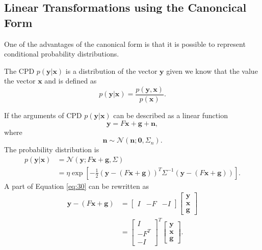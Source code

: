 \documentclass[12pt,oneside,openany,a4paper, %
afrikaans,english,
]{memoir}
\numberwithin{equation}{chapter}
\begin{document}
\subsection{Linear Transformations using the Canoncical Form}
One of the advantages of the canonical form is that it is possible to represent conditional probability distributions.

The CPD $p(\bm{y}|\bm{x})$ is a distribution of the vector $\bm{y}$ given we know that the value the vector $\bm{x}$ and is defined as
\begin{equation}
p(\bm{y}|\bm{x}) = \frac{p(\bm{y},\bm{x})}{p(\bm{x})}.
\end{equation}

If the arguments of CPD $p(\bm{y}|\bm{x})$ can be described as a linear function
\begin{equation}
\bm{y} = F\bm{x} + \bm{g} + \bm{n},
\end{equation}
where
\begin{equation}
\bm{n} \sim \mathcal{N}(\bm{n}; \bm{0}, \Sigma_n).
\end{equation}
The probability distribution is
\begin{equation}
\label{eq:30}
\begin{split}
p(\bm{y}|\bm{x}) & = \mathcal{N}(\bm{y}; F\bm{x} + \bm{g}, \Sigma) \\
& = \eta\exp\left[-\frac{1}{2}(\bm{y} - (F\bm{x} + \bm{g}))^T\Sigma^{-1}(\bm{y}-(F\bm{x} + \bm{g}))\right].
\end{split}
\end{equation}
A part of Equation \ref{eq:30} can be rewritten as 
\begin{equation}\label{eq: rewrite}
\begin{split}
\bm{y} - (F\bm{x} + \bm{g}) & =
\begin{bmatrix}
I&-F&-I
\end{bmatrix}
\begin{bmatrix}
\bm{y}\\
\bm{x}\\
\bm{g}
\end{bmatrix}\\
& =
\begin{bmatrix}
I\\-F^T\\-I
\end{bmatrix}^T
\begin{bmatrix}
\bm{y}\\
\bm{x}\\
\bm{g}
\end{bmatrix}.
\end{split}
\end{equation}
\end{document}
